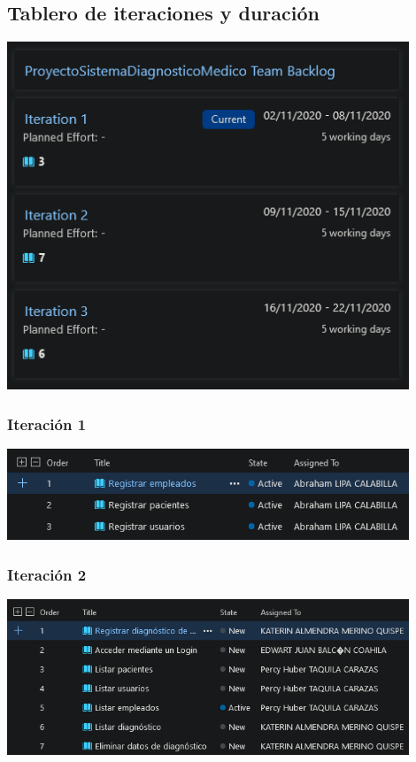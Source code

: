\documentclass[preprint,12pt]{elsarticle}
\begin{document}
	\subsection{Tablero de iteraciones y duración}
	\begin{center}
		\includegraphics[width=12cm]{./imagen/Screenshot_4.png} 
	\end{center}
	\subsubsection{Iteración 1}
	\begin{center}
	\includegraphics[width=12cm]{./imagen/Screenshot_7.png} 
	\end{center}
	\subsubsection{Iteración 2}
	\begin{center}
	\includegraphics[width=12cm]{./imagen/Screenshot_6.png} 
	\end{center}
\end{document}
